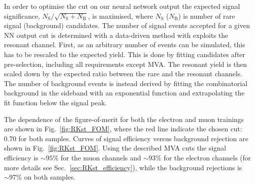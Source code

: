 In order to optimise the cut on our neural network output the expected signal significance,
$N_{\mathrm{S}}/\sqrt{N_{\mathrm{S}}+N_{\mathrm{B}}}$, is maximised,
where $N_\mathrm{S}$ ($N_\mathrm{B}$) is number of rare signal (background) candidates.
%
The number of signal events accepted for a given NN output cut is determined with a data-driven method
with exploits the resonant channel. First, as an arbitrary number of events can be simulated, this has to be rescaled
to the expected yield. This is done by fitting \decay{\Bz}{\Kstarz(\jpsi\to\ll)} candidates after pre-selection,
including all requirements except MVA. The resonant yield is then scaled down by the expected ratio between
the rare and the resonant channels. The number of background events is instead derived by fitting the combinatorial
background in the sideband with an exponential function and extrapolating the fit function below the signal peak.

The dependence of the figure-of-merit for both the electron and muon trainings
are shown in Fig.~\ref{fig:RKst_FOM}, where the red line indicate the chosen cut: 0.70 for both samples.
Curves of signal efficiency versus background rejection are shown in Fig.~\ref{fig:RKst_FOM}.
Using the described MVA cuts the signal efficiency is $\sim 95\%$ for the muon channels
and $\sim 93\%$ for the electron channels (for more details see Sec.~\ref{sec:RKst_efficiency}),
while the background rejections is $\sim 97\%$ on both samples.

